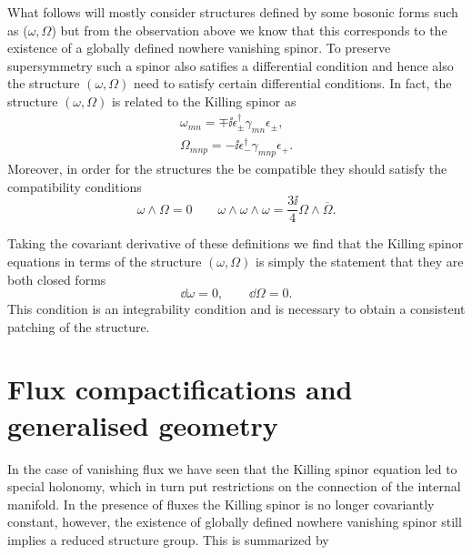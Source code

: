 What follows will mostly consider structures defined by some bosonic forms such as ($\omega,\Omega$) but from the observation above we know that this corresponds to the existence of a globally defined nowhere vanishing spinor. To preserve supersymmetry such a spinor also satifies a differential condition and hence also the structure $(\omega,\Omega)$ need to satisfy certain differential conditions. In fact, the structure $(\omega,\Omega)$ is related to the Killing spinor as 
\begin{align}
    \omega_{mn} = \mp\ii \epsilon^\dagger_\pm\gamma_{mn}\epsilon_\pm,\\
    \Omega_{mnp} = -\ii\epsilon^\dagger_-\gamma_{mnp}\epsilon_+.
\end{align}
Moreover, in order for the structures the be compatible they should satisfy the compatibility conditions 
\begin{equation}\label{eq:CompatibilityCalabiYau}
    \omega\wedge\Omega = 0\qquad \omega\wedge\omega\wedge\omega = \frac{3\ii}{4}\Omega\wedge\overbar{\Omega}.
\end{equation}

Taking the covariant derivative of these definitions we find that the Killing spinor equations in terms of the structure $(\omega,\Omega)$ is simply the statement that they are both closed forms 
\begin{equation}
    \dd \omega = 0, \qquad \dd \Omega = 0.
\end{equation}
This condition is an integrability condition and is necessary to obtain a consistent patching of the structure. %

\section{Flux compactifications and generalised geometry}
In the case of vanishing flux we have seen that the Killing spinor equation led to special holonomy, which in turn put restrictions on the connection of the internal manifold. In the presence of fluxes the Killing spinor is no longer covariantly constant, however, the existence of globally defined nowhere vanishing spinor still implies a reduced structure group. This is summarized by 

